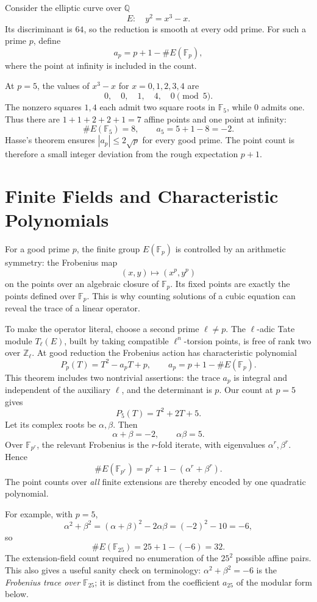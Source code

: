 Consider the elliptic curve over \(\mathbb Q\)
\[
 E:\quad y^2=x^3-x.
\]
Its discriminant is \(64\), so the reduction is smooth at every odd prime. For such a prime \(p\), define
\[
 a_p=p+1-\#E(\mathbb F_p),
\]
where the point at infinity is included in the count.

At \(p=5\), the values of \(x^3-x\) for \(x=0,1,2,3,4\) are
\[
 0,\quad0,\quad1,\quad4,\quad0\pmod5.
\]
The nonzero squares \(1,4\) each admit two square roots in \(\mathbb F_5\), while \(0\) admits one. Thus there are \(1+1+2+2+1=7\) affine points and one point at infinity:
\[
 \#E(\mathbb F_5)=8,\qquad \boxed{a_5=5+1-8=-2.}
\]
Hasse's theorem ensures \(|a_p|\le2\sqrt p\) for every good prime. The point count is therefore a small integer deviation from the rough expectation \(p+1\).

\section{Finite Fields and Characteristic Polynomials}

For a good prime \(p\), the finite group \(E(\mathbb F_p)\) is controlled by an arithmetic symmetry: the Frobenius map
\[
 (x,y)\longmapsto(x^p,y^p)
\]
on the points over an algebraic closure of \(\mathbb F_p\). Its fixed points are exactly the points defined over \(\mathbb F_p\). This is why counting solutions of a cubic equation can reveal the trace of a linear operator.

To make the operator literal, choose a second prime \(\ell\ne p\). The \(\ell\)-adic Tate module \(T_\ell(E)\), built by taking compatible \(\ell^n\)-torsion points, is free of rank two over \(\mathbb Z_\ell\). At good reduction the Frobenius action has characteristic polynomial
\[
 \boxed{P_p(T)=T^2-a_pT+p},
 \qquad a_p=p+1-\#E(\mathbb F_p).
\]
This theorem includes two nontrivial assertions: the trace \(a_p\) is integral and independent of the auxiliary \(\ell\), and the determinant is \(p\). Our count at \(p=5\) gives
\[
 P_5(T)=T^2+2T+5.
\]
Let its complex roots be \(\alpha,\beta\). Then
\[
 \alpha+\beta=-2,\qquad \alpha\beta=5.
\]
Over \(\mathbb F_{p^r}\), the relevant Frobenius is the \(r\)-fold iterate, with eigenvalues \(\alpha^r,\beta^r\). Hence
\[
 \#E(\mathbb F_{p^r})=p^r+1-(\alpha^r+\beta^r).
\]
The point counts over \emph{all} finite extensions are thereby encoded by one quadratic polynomial.

For example, with \(p=5\),
\[
 \alpha^2+\beta^2=(\alpha+\beta)^2-2\alpha\beta
                 =(-2)^2-10=-6,
\]
so
\[
 \boxed{\#E(\mathbb F_{25})=25+1-(-6)=32.}
\]
The extension-field count required no enumeration of the \(25^2\) possible affine pairs. This also gives a useful sanity check on terminology: \(\alpha^2+\beta^2=-6\) is the \emph{Frobenius trace over \(\mathbb F_{25}\)}; it is distinct from the coefficient \(a_{25}\) of the modular form below.

